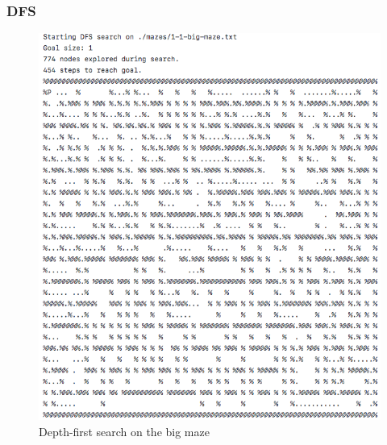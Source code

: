 \documentclass[titlepage]{article}
\begin{document}
\subsubsection*{DFS}
\begin{figure}[h!]
\includegraphics[width=\linewidth]{dfsbig.png}
\caption{Depth-first search on the big maze}
\label{fig:DFSbig}
\end{figure}

\newpage
\end{document}
